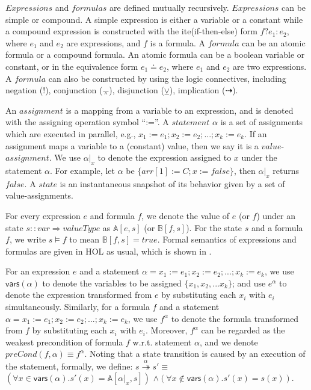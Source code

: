 \documentclass[conference]{IEEEtran}
\def \eqc {\doteq }
\def \andc {\barwedge }
\def \negc {!}
\def \orc {\veebar }
\begin{document}

$Expressions$ and $formulas$ are defined mutually recursively. $Expressions$ can be simple or compound. A simple expression is either a variable or a constant while a compound expression is constructed with the ite(if-then-else) form $f?e_1:e_2$, where $e_1$ and $e_2$ are expressions, and $f$ is a formula.
A $formula$ can be an atomic formula or a compound formula. An atomic formula can be a boolean variable or  constant, or in the equivalence form $e_1\eqc e_2$, where $e_1$ and $e_2$ are two expressions. A $formula$ can also be constructed by using the logic connectives, including negation ($\negc$), conjunction ($\andc$), disjunction ($\orc$), implication ($\dashrightarrow$). %

An $assignment$ is a mapping from a variable to an expression, and is denoted with the assigning operation symbol ``:=''. A $statement$ $\alpha$ is a set of assignments which are executed in parallel, e.g., $ x_1:=e_1;x_2:=e_2;...;x_k:=e_k $. If an assignment maps a variable to a (constant) value, then we say it is a $value$-$assignment$.  We use $\alpha|_x$ to denote the expression assigned to $x$ under the statement $\alpha$. For example, let $\alpha$ be $\{arr[1]:=C;x:=false\}$, then $\alpha|_x$ returns $false$. A $state$ is an instantaneous snapshot of its behavior given by a set of value-assignments.




For every expression $e$ and formula $f$, we denote the value of $e$ (or $f$) under an state $s::var \Rightarrow valueType $ as $\mathbb{A}[e,s]$ (or $\mathbb{B}[f,s]$).
For the state $s$ and a formula $f$, we write
$s\models f$ to mean %
$\mathbb{B}[f,s]=true$.
Formal semantics of expressions and formulas are given in HOL  as usual, which is shown in \cite{LiCache16}. %


For an expression $e$ and a statement $\alpha= x_1:=e_1;x_2:=e_2;...;x_k:=e_k $, we use $\mathsf{vars(\alpha)}$ to denote the variables to be assigned $\{x_1,x_2,...x_k\}$; and use $e^{\alpha}$ to denote the expression transformed from $e$ by substituting each $x_i$ with $e_i$ simultaneously.
Similarly, for a formula $f$  and a statement $\alpha= x_1:=e_1;x_2:=e_2;...;x_k:=e_k $, we use $f^{\alpha}$ to denote the formula transformed from $f$ by substituting each $x_i$ with $e_i$.
Moreover, $f^{\alpha}$ can be regarded as the weakest precondition of formula $f$ w.r.t. statement $\alpha$, and we denote $preCond(f,\alpha)\equiv f^{\alpha}$. Noting that a state transition is caused by an execution of the statement, formally, we define: $s\overset{\alpha}{\twoheadrightarrow } s' \equiv$ $(\forall x \in \mathsf{vars}(\alpha). s'(x)= \mathbb{A}[\alpha|_x,s])$ $\wedge (\forall x \notin \mathsf{vars}(\alpha). s'(x)= s(x))$.
\end{document}
